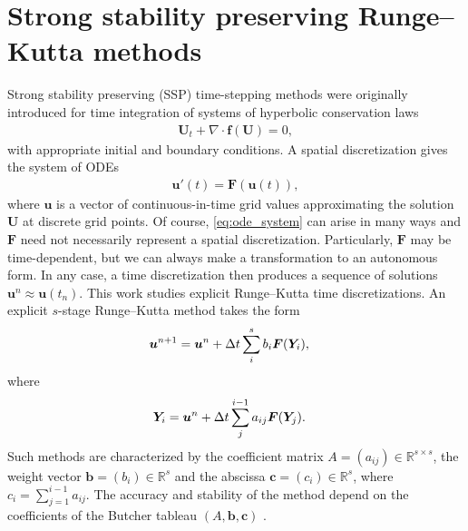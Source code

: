 \documentclass{siamltex}  %
\begin{document}
\section{Strong stability preserving Runge--Kutta methods}\label{sec:SSP}
Strong stability preserving (SSP) time-stepping methods were originally introduced
for time integration of systems of hyperbolic conservation laws
\cite{Shu/Osher:1988} 
\begin{align}\label{eq:pde}
	\bm{U}_t + \nabla \cdot \bm{f}(\bm{U}) = 0,   
\end{align}
with appropriate initial and boundary conditions.
A spatial discretization gives the system of ODEs
\begin{align}\label{eq:ode_system}
    \bm{u}'(t) = \bm{F}(\bm{u}(t)),
\end{align}
where $\bm{u}$ is a vector of continuous-in-time grid values approximating 
the solution $\bm{U}$ at discrete grid points.
Of course, \eqref{eq:ode_system} can arise in many ways and $\bm{F}$
need not necessarily represent a spatial discretization.
Particularly, $\bm{F}$ may be time-dependent, but we can always make a 
transformation to an autonomous form.
In any case, a time discretization then produces a sequence of
solutions $\bm{u}^{n} \approx \bm{u}(t_n)$.
This work studies explicit Runge--Kutta time discretizations.
An explicit $s$-stage Runge--Kutta method takes the form
\begin{align*}
	\bm{u}^{n+1} &= \bm{u}^{n} + \Delta t \sum_i^s b_i \bm{F}(\bm{Y}_i), 
\end{align*}
where
\begin{align*}
	\bm{Y}_i &= \bm{u}^{n} + \Delta t \sum_j^{i-1} a_{ij} \bm{F}(\bm{Y}_j).
\end{align*}
Such methods are characterized by the coefficient matrix $A = (a_{ij}) \in 
\mathbb{R}^{s \times s}$, the weight vector $\bm{b} = (b_i) \in \mathbb{R}^s$
and the abscissa $\bm{c} = (c_i) \in \mathbb{R}^s$, where 
$c_i = \sum_{j=1}^{i-1}a_{ij}$.
The accuracy and stability of the method depend on the coefficients of the 
Butcher tableau $(A,\bm{b},\bm{c})$ \cite{Butcher2008_book}.
\end{document}

